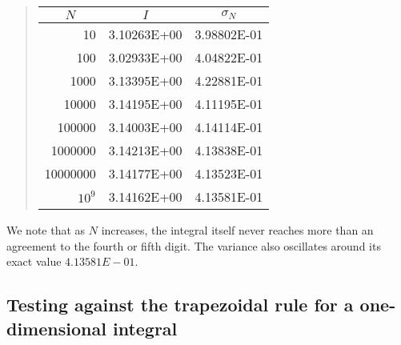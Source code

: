 \documentclass[%
oneside,                 %
final,                   %
10pt]{article}
\newenvironment{block_mdfboxadmon}[1][]{
\begin{block_mdfboxmdframed}[frametitle=#1]
}
{
\end{block_mdfboxmdframed}
}
\begin{document}
\begin{block_mdfboxadmon}[]


\begin{quote}
\begin{tabular}{rll}
\hline
\multicolumn{1}{c}{ $N$ } & \multicolumn{1}{c}{ $I$ } & \multicolumn{1}{c}{ $\sigma_N$ } \\
\hline
10       & 3.10263E+00 & 3.98802E-01 \\
100      & 3.02933E+00 & 4.04822E-01 \\
1000     & 3.13395E+00 & 4.22881E-01 \\
10000    & 3.14195E+00 & 4.11195E-01 \\
100000   & 3.14003E+00 & 4.14114E-01 \\
1000000  & 3.14213E+00 & 4.13838E-01 \\
10000000 & 3.14177E+00 & 4.13523E-01 \\
$10^{9}$ & 3.14162E+00 & 4.13581E-01 \\
\hline
\end{tabular}
\end{quote}

\noindent
We note that as $N$ increases, the integral itself never reaches more than an agreement 
to the fourth or fifth digit. The variance also oscillates around its exact value
$4.13581E-01$.
\end{block_mdfboxadmon} %




\subsection{Testing against the trapezoidal rule for a one-dimensional integral}
\end{document}

